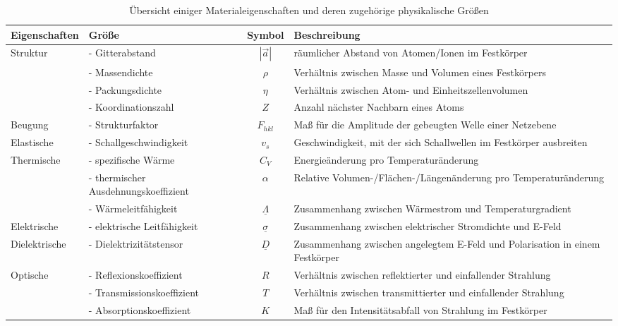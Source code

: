 \documentclass{article}
\begin{document}
	\begin{table}[H]
		\caption{Übersicht einiger Materialeigenschaften und deren zugehörige physikalische Größen}
		\begin{tabularx}{\textwidth}{l|p{4cm}|c|X}
			\hline\hline
				Eigenschaften & Größe & Symbol & Beschreibung \\
			\hline
				Struktur & - Gitterabstand & $|\vec{a}|$ & räumlicher Abstand von Atomen/Ionen im Festkörper \\
				& - Massendichte & $\rho$ & Verhältnis zwischen Masse und Volumen eines Festkörpers \\
				& - Packungsdichte & $\eta$ & Verhältnis zwischen Atom- und Einheitszellenvolumen \\
				& - Koordinationszahl & $Z$ & Anzahl nächster Nachbarn eines Atoms \\
			\hline
				Beugung 	& - Strukturfaktor & $F_{hkl}$ & Maß für die Amplitude der gebeugten Welle einer Netzebene \\
			\hline
				Elastische & - Schallgeschwindigkeit & $v_s$ & Geschwindigkeit, mit der sich Schallwellen im Festkörper ausbreiten \\
			\hline
				Thermische & - spezifische Wärme & $C_V$ & Energieänderung pro Temperaturänderung \\
				& - thermischer Ausdehnungskoeffizient & $\alpha$ & Relative Volumen-/Flächen-/Längenänderung pro Temperaturänderung \\
				& - Wärmeleitfähigkeit & $\underline{\Lambda}$ & Zusammenhang zwischen Wärmestrom und Temperaturgradient \\
			\hline
				Elektrische & - elektrische Leitfähigkeit & $\underline{\sigma}$ & Zusammenhang zwischen elektrischer Stromdichte und E-Feld \\
			\hline
				Dielektrische & - Dielektrizitätstensor & $\underline{D}$ & Zusammenhang zwischen angelegtem E-Feld und Polarisation in einem Festkörper \\
			\hline
				Optische & - Reflexionskoeffizient & $R$ & Verhältnis zwischen reflektierter und einfallender Strahlung \\
				& - Transmissionskoeffizient & $T$ & Verhältnis zwischen transmittierter und einfallender Strahlung \\
				& - Absorptionskoeffizient & $K$ & Maß für den Intensitätsabfall von Strahlung im Festkörper \\
			\hline\hline		
		\end{tabularx}
		\label{tabelle abstrakt}
	\end{table}
\end{document}

